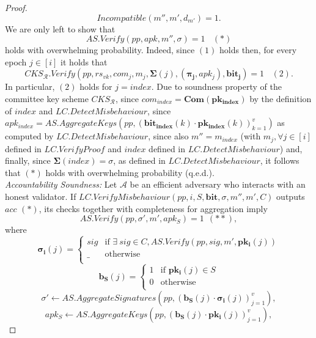 \begin{proof}
 $$\mathit{Incompatible(m'', m', d_{m'})} = 1.$$ We are only left to show that 
 $$\mathit{AS.Verify}(\mathit{pp}, \mathit{apk}, m'', \sigma) =1 \ \ \ \ (*)$$ 
\noindent holds with overwhelming probability. Indeed, since $(1)$ holds then, for every epoch $j \in [i]$ it holds that 
$$\mathit{CKS_{\mathcal{R}}.Verify}(\mathit{pp},  \mathit{rs_{\mathit{vk}}}, \mathit{com_j}, m_j,  \mathbf{\Sigma}(j), (\mathbf{\pi_{j}},\mathit{apk_j}), 
\mathbf{bit_j}) = 1 \ \ \ \ (2).$$
\noindent In particular, $(2)$ holds for $j = \mathit{index}$. Due to soundness property of the committee key scheme $\mathit{CKS_{\mathcal{R}}}$, 
since $\mathit{com_{\mathit{index}}} = \mathbf{Com}(\mathbf{pk_{\mathbf{index}}})$ by the definition of $\mathit{index}$ and 
$\mathit{LC.DetectMisbehaviour}$, since $\mathit{apk_{\mathit{index}}} = \mathit{AS.AggregateKeys}(\mathit{pp}, 
(\mathbf{bit_{\mathbf{index}}}(k) \cdot \mathbf{pk_{\mathbf{index}}}(k))_{k=1}^v)$ as computed by $\mathit{LC.DetectMisbehaviour}$, 
since also $m'' = m_{\mathit{index}}$ (with $m_j, \forall j \in [i]$ defined in $\mathit{LC.VerifyProof}$ and $\mathit{index}$ defined 
in $\mathit{LC.DetectMisbehaviour}$) and, finally, since $\mathbf{\Sigma}(\mathit{index}) = \sigma$, as defined in $\mathit{LC.DetectMisbehaviour}$, 
it follows that $(*)$ holds with overwhelming probability (q.e.d.). \\
 
\noindent \textit{Accountability Soundness:} Let $\mathcal{A}$ be an efficient adversary who interacts with an honest validator. If $\mathit{LC.VerifyMisbehaviour}(\mathit{pp}, i, S, \mathbf{bit}, \sigma, m'', m', C)$ 
outputs $\mathit{acc}$ $(\ast)$, its checks together with completeness for aggregation imply 
$$\mathit{AS.Verify}(\mathit{pp}, \sigma', m', \mathit{apk_S}) = 1 \ \ (\ast\ast),$$
where 
\begin{equation*}
  \mathbf{\sigma_i}(j) =
    \begin{cases}
      \mathit{sig} & \text{if }  \exists \ \mathit{sig} \in C, \mathit{AS.Verify}(\mathit{pp}, \mathit{sig}, m', \mathbf{pk_i}(j)) \\
      \_ & \text{otherwise} \\
    \end{cases}       
\end{equation*}
\begin{equation*}
  \mathbf{b_{S}}(j) =
    \begin{cases}
      1 & \text{if }  \mathbf{pk_i}(j) \in S \\
      0 & \text{otherwise} \\
    \end{cases}       
\end{equation*}
$$ \sigma' \leftarrow  \mathit{AS.AggregateSignatures}(\mathit{pp}, (\mathbf{b_{S}}(j) \cdot \mathbf{\sigma_i}(j))_{j=1}^v),$$
$$\mathit{apk_S} \leftarrow \mathit{AS.AggregateKeys}(\mathit{pp},(\mathbf{b_{S}}(j) \cdot \mathbf{pk_i}(j))_{j=1}^v),$$


\end{proof}
